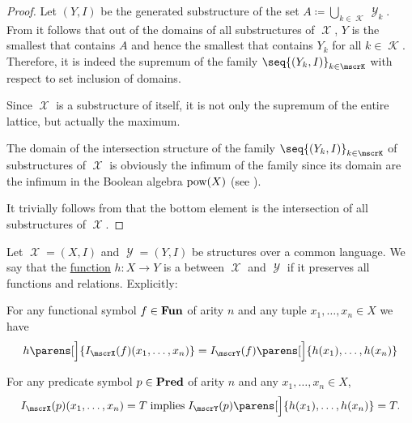 \begin{proof}
   Let \( (Y, I) \) be the generated substructure of the set \( A \coloneqq \bigcup_{k \in \mscrK} \mscrY_k \). From  it follows that out of the domains of all substructures of \( \mscrX \), \( Y \) is the smallest that contains \( A \) and hence the smallest that contains \( Y_k \) for all \( k \in \mscrK \). Therefore, it is indeed the supremum of the family \( \seq{ (Y_k, I) }_{k \in \mscrK} \) with respect to set inclusion of domains.

   Since \( \mscrX \) is a substructure of itself, it is not only the supremum of the entire lattice, but actually the maximum.

   The domain of the intersection structure of the family \( \seq{ (Y_k, I) }_{k \in \mscrK} \) of substructures of \( \mscrX \) is obviously the infimum of the family since its domain are the infimum in the Boolean algebra \( \operatorname{pow}(X) \) (see ).

   It trivially follows from  that the bottom element is the intersection of all substructures of \( \mscrX \).
\end{proof}

\begin{definition}\label{def:first_order_homomorphism}
  Let \( \mscrX = (X, I) \) and \( \mscrY = (Y, I) \) be structures over a common language. We say that the \hyperref[def:function]{function} \( h: X \to Y \) is a  between \( \mscrX \) and \( \mscrY \) if it preserves all functions and relations. Explicitly:
  \begin{thmenum}
     For any functional symbol \( f \in \operatorname{\mathbf{Fun}} \) of arity \( n \) and any tuple \( x_1, \ldots, x_n \in X \) we have
    \begin{equation*}
      h\parens[\Big]{ I_\mscrX(f)(x_1, \ldots, x_n) } = I_\mscrY(f) \parens[\Big]{ h(x_1), \ldots, h(x_n) }
    \end{equation*}

     For any predicate symbol \( p \in \operatorname{\mathbf{Pred}} \) of arity \( n \) and any \( x_1, \ldots, x_n \in X \),
    \begin{equation*}
      I_\mscrX(p) (x_1, \ldots, x_n) = T \T{implies} I_\mscrY(p) \parens[\Big]{ h(x_1), \ldots, h(x_n) } = T.
    \end{equation*}
  \end{thmenum}
\end{definition}

